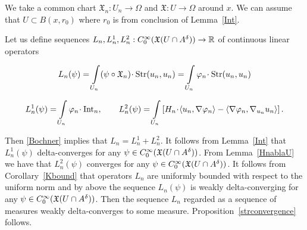 We take a common chart 
$\mathfrak{X}_n:U_n\to\Omega$ and
$\mathfrak{X}:U\to\Omega$ around $x$.
We can assume 
that $U\subset B(x,r_0)$ where $r_0$ is 
from conclusion of Lemma~\ref{Int}.


Let us define sequences 
$L_n, L_n^1, L_n^2:C^\infty_0(\mathfrak X(U\cap A^\delta))\to \mathbb{R}$
of continuous linear operators

$$L_n(\psi)=
\int\limits_{U_n}(\psi\circ\mathfrak X_n )\cdot \Str(u_n, u_n)=
\int\limits_{U_n} \phi_n\cdot \Str(u_n, u_n)
$$

$$L_n^1(\psi)=
\int\limits_{U_n} \phi_n\cdot \Int_n,
\qquad L_n^2(\psi)=
\int\limits_{U_n}
 \l[H_n\cdot\<u_n,\nabla\phi_n\>- \<\nabla\phi_n,\nabla_{u_n} u_n\> \r].$$

Then \ref{Bochner} implies that $L_n=L_n^1+L_n^2$.
It follows from
Lemma~\ref{Int} that 
$L^1_n(\psi)$ delta-converges for any $\psi\in C^\infty_0(\mathfrak X(U\cap A^\delta))$.
From Lemma~\ref{HnablaU} we have that
$L^2_n(\psi)$ converges for any $\psi\in C^\infty_0(\mathfrak X(U\cap A^\delta))$.
It follows from Corollary~\ref{Kbound}  that operators $L_n$
are uniformly bounded with respect to the uniform norm and by above the sequence 
$L_n(\psi)$ is weakly  delta-converging for any $\psi\in C^\infty_0(\mathfrak X(U\cap A^\delta))$.
Then the sequence $L_n$ regarded as a sequence 
of measures weakly delta-converges to some 
measure.
Proposition~\ref{strconvergence} follows.
\qeds
